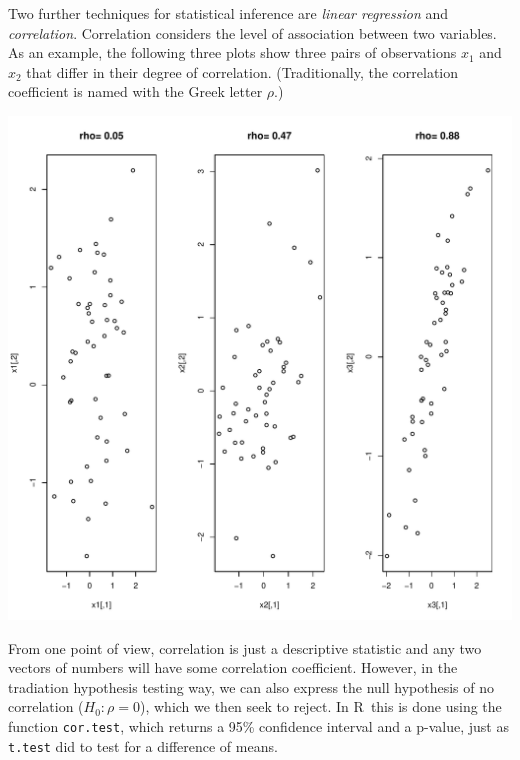 \documentclass{article}\usepackage[]{graphicx}\usepackage[]{color}
\makeatletter
\def\maxwidth{ %
  \ifdim\Gin@nat@width>\linewidth
    \linewidth
  \else
    \Gin@nat@width
  \fi
}
\newenvironment{kframe}{%
 \def\at@end@of@kframe{}%
 \ifinner\ifhmode%
  \def\at@end@of@kframe{\end{minipage}}%
  \begin{minipage}{\columnwidth}%
 \fi\fi%
 \def\FrameCommand##1{\hskip\@totalleftmargin \hskip-\fboxsep
 \colorbox{shadecolor}{##1}\hskip-\fboxsep
     \hskip-\linewidth \hskip-\@totalleftmargin \hskip\columnwidth}%
 \MakeFramed {\advance\hsize-\width
   \@totalleftmargin\z@ \linewidth\hsize
   \@setminipage}}%
 {\par\unskip\endMakeFramed%
 \at@end@of@kframe}
\newenvironment{knitrout}{}{} %
\newcommand{\R}{\textsf{R}}
\newcommand{\code}[1]{\texttt{#1}}
\theoremstyle{exercise}
\makeatother
\begin{document}
Two further techniques for statistical inference are \textit{linear regression} and \textit{correlation}. Correlation considers the level of association between two variables. As an example, the following three plots show three pairs of observations $x_1$ and $x_2$ that differ in their degree of correlation. (Traditionally, the correlation coefficient is named with the Greek letter $\rho$.)

\begin{knitrout}
\color{fgcolor}\begin{kframe}


{\ttfamily\noindent\itshape\color{messagecolor}{\#\# Loading required package: mvtnorm}}\end{kframe}
\includegraphics[width=\maxwidth]{figure/unnamed-chunk-18-1} 

\end{knitrout}

From one point of view, correlation is just a descriptive statistic and any two vectors of numbers will have some correlation coefficient. However, in the tradiation hypothesis testing way, we can also express the null hypothesis of no correlation ($H_0: \rho=0$), which we then seek to reject. In \R\, this is done using the function \code{cor.test}, which returns a 95\% confidence interval and a p-value, just as \code{t.test} did to test for a difference of means.
\end{document}

